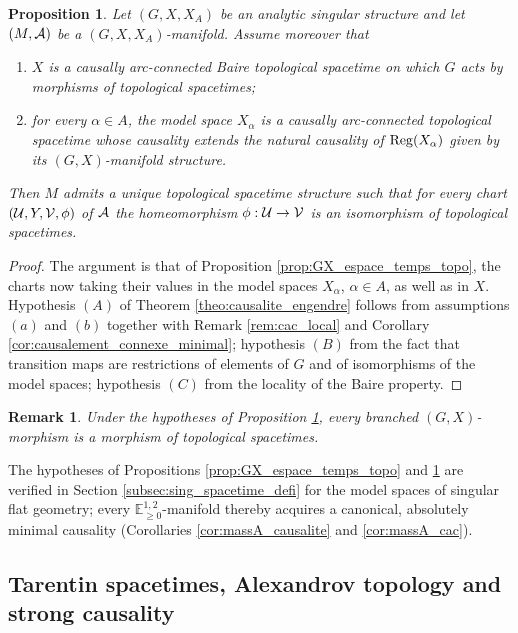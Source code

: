 \documentclass[a4paper,twoside]{article}
\newcommand{\mass}[1]{\mathbb{E}^{1,2}_{#1}}
\newtheorem{prop}[lem]{Proposition}
\newtheorem{rem}[lem]{Remark}
\begin{document}
\begin{prop}\label{prop:GX_sing_espace_temps_topo} Let $(G,X,X_A)$ be an analytic singular structure and
let $(M,\mathcal A)$ be a $(G,X,X_A)$-manifold. Assume moreover that
\begin{enumerate}[label=(\alph*)]
\item $X$ is a causally arc-connected Baire topological spacetime on which $G$ acts by morphisms of topological spacetimes;
\item for every $\alpha \in A$, the model space $X_\alpha$ is a causally arc-connected topological spacetime whose causality extends the natural causality of $\mathrm{Reg}(X_\alpha)$ given by its $(G,X)$-manifold structure.
\end{enumerate}
Then $M$ admits a unique topological spacetime structure such that for every chart $(\mathcal{U},Y,\mathcal V,\phi)$ of $\mathcal A$
the homeomorphism $\phi:\mathcal{U}\rightarrow \mathcal V$ is an isomorphism of topological spacetimes.
\end{prop}
\begin{proof}
The argument is that of Proposition \ref{prop:GX_espace_temps_topo}, the charts now taking
their values in the model spaces $X_\alpha$, $\alpha\in A$, as well as in $X$. Hypothesis
$(A)$ of Theorem \ref{theo:causalite_engendre} follows from assumptions $(a)$ and $(b)$
together with Remark \ref{rem:cac_local} and Corollary \ref{cor:causalement_connexe_minimal}; hypothesis $(B)$ from the
fact that transition maps are restrictions of elements of $G$ and of isomorphisms of the
model spaces; hypothesis $(C)$ from the locality of the Baire property.
\end{proof}

\begin{rem} Under the hypotheses of Proposition \ref{prop:GX_sing_espace_temps_topo}, every
branched $(G,X)$-morphism is a morphism of topological spacetimes.
\end{rem}

The hypotheses of Propositions \ref{prop:GX_espace_temps_topo} and
\ref{prop:GX_sing_espace_temps_topo} are verified in Section \ref{subsec:sing_spacetime_defi} for
the model spaces of singular flat geometry; every $\mass{\geq0}$-manifold thereby acquires a
canonical, absolutely minimal causality (Corollaries \ref{cor:massA_causalite} and
\ref{cor:massA_cac}).

\subsection{Tarentin spacetimes, Alexandrov topology and strong causality}
\end{document}
